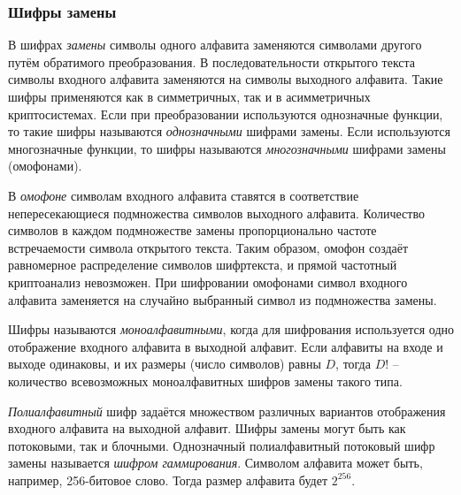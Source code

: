 \subsubsection{Шифры замены}

В шифрах \emph{замены} символы одного алфавита заменяются символами другого путём обратимого преобразования. В последовательности открытого текста символы входного алфавита заменяются на символы выходного алфавита. Такие шифры применяются как в симметричных, так и в асимметричных криптосистемах. Если при преобразовании используются однозначные функции, то такие шифры называются \emph{однозначными} шифрами замены. Если используются многозначные функции, то шифры называются \emph{многозначными} шифрами замены (омофонами).

В \emph{омофоне} символам входного алфавита ставятся в соответствие непересекающиеся подмножества символов выходного алфавита. Количество символов в каждом подмножестве замены пропорционально частоте встречаемости символа открытого текста. Таким образом, омофон создаёт равномерное распределение символов шифртекста, и прямой частотный криптоанализ невозможен. При шифровании омофонами символ входного алфавита заменяется на случайно выбранный символ из подмножества замены.

Шифры называются \emph{моноалфавитными}, когда для шифрования используется одно отображение входного алфавита в выходной алфавит. Если алфавиты на входе и выходе одинаковы, и их размеры (число символов) равны $D$, тогда $D!$ -- количество всевозможных моноалфавитных шифров замены такого типа.

\emph{Полиалфавитный} шифр задаётся множеством различных вариантов отображения входного алфавита на выходной алфавит. Шифры замены могут быть как потоковыми, так и блочными. Однозначный полиалфавитный потоковый шифр замены называется \emph{шифром гаммирования}. Символом алфавита может быть, например, 256-битовое слово. Тогда размер алфавита будет $2^{256}$.
